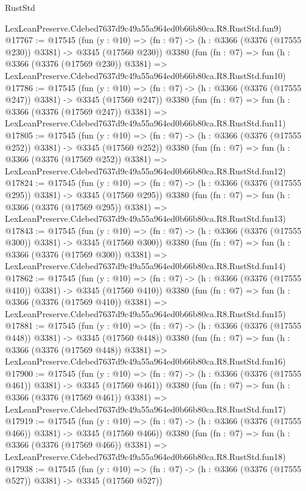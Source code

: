 \begin{lexlean}{RustStd}
\begin{coremodule}
    LexLeanPreserve.Cdebed7637d9c49a55a964ed0b66b80ca.R8.RustStd.fun9)
@17767 := @17545
    (fun (y : @10) => (fn : @7) -> (h : @3366 (@3376 (@17555 @230)) @3381) -> @3345 (@17560 @230))
    @3380
    (fun (fn : @7) =>
    fun (h : @3366 (@3376 (@17569 @230)) @3381) =>
    LexLeanPreserve.Cdebed7637d9c49a55a964ed0b66b80ca.R8.RustStd.fun10)
@17786 := @17545
    (fun (y : @10) => (fn : @7) -> (h : @3366 (@3376 (@17555 @247)) @3381) -> @3345 (@17560 @247))
    @3380
    (fun (fn : @7) =>
    fun (h : @3366 (@3376 (@17569 @247)) @3381) =>
    LexLeanPreserve.Cdebed7637d9c49a55a964ed0b66b80ca.R8.RustStd.fun11)
@17805 := @17545
    (fun (y : @10) => (fn : @7) -> (h : @3366 (@3376 (@17555 @252)) @3381) -> @3345 (@17560 @252))
    @3380
    (fun (fn : @7) =>
    fun (h : @3366 (@3376 (@17569 @252)) @3381) =>
    LexLeanPreserve.Cdebed7637d9c49a55a964ed0b66b80ca.R8.RustStd.fun12)
@17824 := @17545
    (fun (y : @10) => (fn : @7) -> (h : @3366 (@3376 (@17555 @295)) @3381) -> @3345 (@17560 @295))
    @3380
    (fun (fn : @7) =>
    fun (h : @3366 (@3376 (@17569 @295)) @3381) =>
    LexLeanPreserve.Cdebed7637d9c49a55a964ed0b66b80ca.R8.RustStd.fun13)
@17843 := @17545
    (fun (y : @10) => (fn : @7) -> (h : @3366 (@3376 (@17555 @300)) @3381) -> @3345 (@17560 @300))
    @3380
    (fun (fn : @7) =>
    fun (h : @3366 (@3376 (@17569 @300)) @3381) =>
    LexLeanPreserve.Cdebed7637d9c49a55a964ed0b66b80ca.R8.RustStd.fun14)
@17862 := @17545
    (fun (y : @10) => (fn : @7) -> (h : @3366 (@3376 (@17555 @410)) @3381) -> @3345 (@17560 @410))
    @3380
    (fun (fn : @7) =>
    fun (h : @3366 (@3376 (@17569 @410)) @3381) =>
    LexLeanPreserve.Cdebed7637d9c49a55a964ed0b66b80ca.R8.RustStd.fun15)
@17881 := @17545
    (fun (y : @10) => (fn : @7) -> (h : @3366 (@3376 (@17555 @448)) @3381) -> @3345 (@17560 @448))
    @3380
    (fun (fn : @7) =>
    fun (h : @3366 (@3376 (@17569 @448)) @3381) =>
    LexLeanPreserve.Cdebed7637d9c49a55a964ed0b66b80ca.R8.RustStd.fun16)
@17900 := @17545
    (fun (y : @10) => (fn : @7) -> (h : @3366 (@3376 (@17555 @461)) @3381) -> @3345 (@17560 @461))
    @3380
    (fun (fn : @7) =>
    fun (h : @3366 (@3376 (@17569 @461)) @3381) =>
    LexLeanPreserve.Cdebed7637d9c49a55a964ed0b66b80ca.R8.RustStd.fun17)
@17919 := @17545
    (fun (y : @10) => (fn : @7) -> (h : @3366 (@3376 (@17555 @466)) @3381) -> @3345 (@17560 @466))
    @3380
    (fun (fn : @7) =>
    fun (h : @3366 (@3376 (@17569 @466)) @3381) =>
    LexLeanPreserve.Cdebed7637d9c49a55a964ed0b66b80ca.R8.RustStd.fun18)
@17938 := @17545
    (fun (y : @10) => (fn : @7) -> (h : @3366 (@3376 (@17555 @527)) @3381) -> @3345 (@17560 @527))

\end{coremodule}
\end{lexlean}
